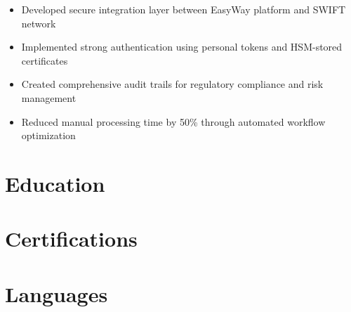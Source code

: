 \documentclass[11pt,a4paper,sans]{moderncv}
\begin{document}
{
\begin{itemize}[leftmargin=*]
\item Developed secure integration layer between EasyWay platform and SWIFT network
\item Implemented strong authentication using personal tokens and HSM-stored certificates
\item Created comprehensive audit trails for regulatory compliance and risk management
\item Reduced manual processing time by 50\% through automated workflow optimization
\end{itemize}
}

\section{Education}

\section{Certifications}

\section{Languages}
\end{document}

